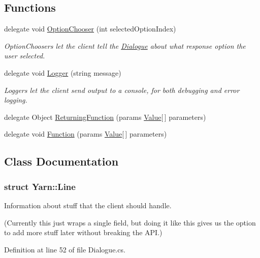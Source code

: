 \subsection*{Functions}
\begin{DoxyCompactItemize}
\item 
delegate void \hyperlink{a00045_a39866cbb03c03a35805d598b5d4ad553}{Option\-Chooser} (int selected\-Option\-Index)
\begin{DoxyCompactList}\small\item\em Option\-Choosers let the client tell the \hyperlink{a00086}{Dialogue} about what response option the user selected. \end{DoxyCompactList}\item 
delegate void \hyperlink{a00045_a1e50031b945a3a2afafee6f590730568}{Logger} (string message)
\begin{DoxyCompactList}\small\item\em Loggers let the client send output to a console, for both debugging and error logging. \end{DoxyCompactList}\item 
delegate Object \hyperlink{a00045_a5177bf74fbfe7303fac9d8236c2e514b}{Returning\-Function} (params \hyperlink{a00181}{Value}\mbox{[}$\,$\mbox{]} parameters)
\item 
delegate void \hyperlink{a00045_ae0be2e5cf13d5779816102439e61ff1a}{Function} (params \hyperlink{a00181}{Value}\mbox{[}$\,$\mbox{]} parameters)
\end{DoxyCompactItemize}


\subsection{Class Documentation}
\label{a00365}
\hypertarget{a00045_a00365}{}
\subsubsection{struct Yarn\-:\-:Line}
Information about stuff that the client should handle. 

(Currently this just wraps a single field, but doing it like this gives us the option to add more stuff later without breaking the A\-P\-I.) 

Definition at line 52 of file Dialogue.\-cs.




